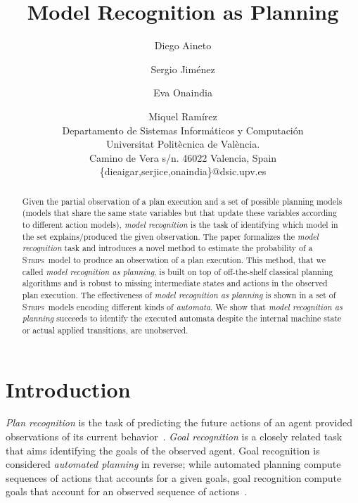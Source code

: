 \documentclass[letterpaper]{article} %
\newcommand{\strips}{\textsc{Strips}}     %
\begin{document}
\title{Model Recognition as Planning}

\author{Diego Aineto\and Sergio Jim\'enez\and Eva Onaindia \and Miquel Ram\'irez\\
{\small Departamento de Sistemas Inform\'aticos y Computaci\'on}\\
{\small Universitat Polit\`ecnica de Val\`encia.}\\
{\small Camino de Vera s/n. 46022 Valencia, Spain}\\
{\small \{dieaigar,serjice,onaindia\}@dsic.upv.es}}



\maketitle
\begin{abstract} 
Given the partial observation of a plan execution and a set of possible planning models (models that share the same state variables but that update these variables according to different action models), {\em model recognition} is the task of identifying which model in the set explains/produced the given observation. The paper formalizes the {\em model recognition} task and introduces a novel method to estimate the probability of a \strips\ model to produce an observation of a plan execution. This method, that we called {\em model recognition as planning}, is built on top of off-the-shelf classical planning algorithms and is robust to missing intermediate states and actions in the observed plan execution. The effectiveness of {\em model recognition as planning} is shown in a set of \strips\ models encoding different kinds of {\em automata}. We show that {\em model recognition as planning} succeeds to identify the executed automata despite the internal machine state or actual applied transitions, are unobserved.
\end{abstract}

\section{Introduction}
\label{sec:introduction}
{\em Plan recognition} is the task of predicting the future actions of an agent provided observations of its current behavior~\cite{carberry2001techniques}. {\em Goal recognition} is a closely related task that aims identifying the goals of the observed agent. Goal recognition is considered {\em automated planning} in reverse; while automated planning compute sequences of actions that accounts for a given goals, goal recognition compute goals that account for an observed sequence of actions~\cite{geffner:book:2013}.
\end{document}

